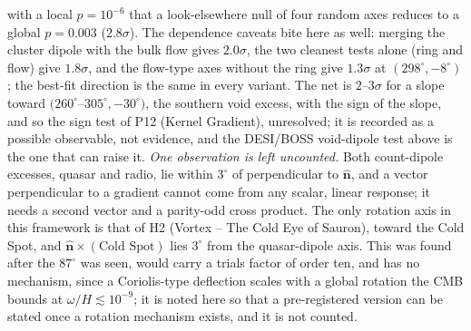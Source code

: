 \documentclass[
  11pt,
]{article}
\begin{document}
with a local \(p = 10^{-6}\) that a look-elsewhere null of four random
axes reduces to a global \(p = 0.003\) (\(2.8\sigma\)). The dependence
caveats bite here as well: merging the cluster dipole with the bulk flow
gives \(2.0\sigma\), the two cleanest tests alone (ring and flow) give
\(1.8\sigma\), and the flow-type axes without the ring give
\(1.3\sigma\) at \((298^\circ, -8^\circ)\); the best-fit direction is
the same in every variant. The net is \(2\)--\(3\sigma\) for a slope
toward \((260^\circ\)--\(305^\circ, -30^\circ)\), the southern void
excess, with the sign of the slope, and so the sign test of P12 (Kernel
Gradient), unresolved; it is recorded as a possible observable, not
evidence, and the DESI/BOSS void-dipole test above is the one that can
raise it. \emph{One observation is left uncounted.} Both count-dipole
excesses, quasar and radio, lie within \(3^\circ\) of perpendicular to
\(\hat{\mathbf n}\), and a vector perpendicular to a gradient cannot
come from any scalar, linear response; it needs a second vector and a
parity-odd cross product. The only rotation axis in this framework is
that of H2 (Vortex -- The Cold Eye of Sauron), toward the Cold Spot, and
\(\hat{\mathbf n} \times (\text{Cold Spot})\) lies \(3^\circ\) from the
quasar-dipole axis. This was found after the \(87^\circ\) was seen,
would carry a trials factor of order ten, and has no mechanism, since a
Coriolis-type deflection scales with a global rotation the CMB bounds at
\(\omega/H \lesssim 10^{-9}\); it is noted here so that a pre-registered
version can be stated once a rotation mechanism exists, and it is not
counted.
\end{document}
